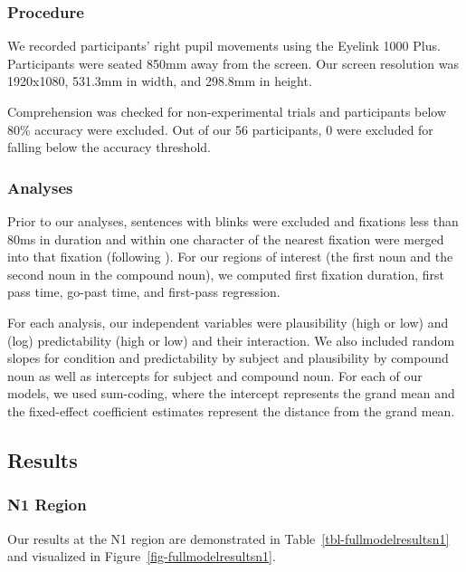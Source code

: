 \documentclass[
  12pt,
  letterpaper,
]{scrreport}
\begin{document}
\subsubsection{Procedure}\label{procedure-2}

We recorded participants' right pupil movements using the Eyelink 1000
Plus. Participants were seated 850mm away from the screen. Our screen
resolution was 1920x1080, 531.3mm in width, and 298.8mm in height.

Comprehension was checked for non-experimental trials and participants
below 80\% accuracy were excluded. Out of our 56 participants, 0 were
excluded for falling below the accuracy threshold.

\subsubsection{Analyses}\label{analyses-1}

Prior to our analyses, sentences with blinks were excluded and fixations
less than 80ms in duration and within one character of the nearest
fixation were merged into that fixation (following
). For
our regions of interest (the first noun and the second noun in the
compound noun), we computed first fixation duration, first pass time,
go-past time, and first-pass regression.

For each analysis, our independent variables were plausibility (high or
low) and (log) predictability (high or low) and their interaction. We
also included random slopes for condition and predictability by subject
and plausibility by compound noun as well as intercepts for subject and
compound noun. For each of our models, we used sum-coding, where the
intercept represents the grand mean and the fixed-effect coefficient
estimates represent the distance from the grand mean.

\subsection{Results}\label{results-3}

\subsubsection{N1 Region}\label{n1-region-1}

Our results at the N1 region are demonstrated in
Table~\ref{tbl-fullmodelresultsn1} and visualized in
Figure~\ref{fig-fullmodelresultsn1}.
\end{document}
